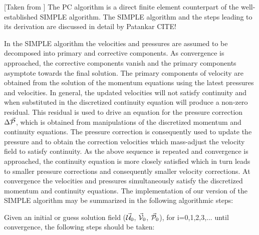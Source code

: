 \documentclass[a4paper,12pt]{article}
\begin{document}
[Taken from \cite{haeh93}] 
The PC algorithm is a direct finite element counterpart of the 
well-established SIMPLE algorithm. The SIMPLE algorithm and the steps
leading to its derivation are discussed in detail by Patankar CITE!

In the SIMPLE algorithm the velocities and pressures are assumed to 
be decomposed into primary and corrective components. As convergence 
is approached, the corrective components vanish and the primary 
components asymptote towards the final solution. The primary components 
of velocity are obtained from the solution of the momentum equations 
using the latest pressures and velocities. In general, the updated 
velocities will not satisfy continuity and when substituted in the 
discretized continuity equation will produce a non-zero residual. This residual
is used to drive an equation for the pressure correction $\Delta \vec{\cal P}$, which 
is obtained from manipulations of the discretized momentum and 
continuity equations. The pressure correction is consequently
used to update the pressure and to obtain the correction velocities 
which mass-adjust the velocity field to satisfy continuity. As the above 
sequence is repeated and convergence is approached, the
continuity equation is more closely satisfied which in turn leads to 
smaller pressure corrections and consequently smaller velocity corrections. 
At convergence the velocities and pressures
simultaneously satisfy the discretized momentum and continuity equations.
The implementation of our version of the SIMPLE algorithm may be summarized in the
following algorithmic steps:

Given an initial or guess solution field 
($\vec{\cal U}_0$, $\vec{\cal V}_0$, $\vec{\cal P}_0$), 
for i=0,1,2,3,... until convergence, the following steps should be taken:
\end{document}
